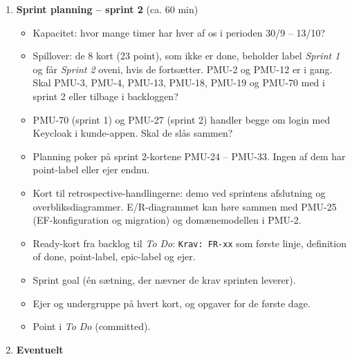 \documentclass[a4paper,11pt]{article}
\begin{document}
\begin{enumerate}
\begin{itemize}
\begin{itemize}
        \end{itemize}
        \item Skal definition of done justeres?
    \end{itemize}
    \item \textbf{Sprint planning -- sprint 2} (ca. 60 min)
    \begin{itemize}
        \item Kapacitet: hvor mange timer har hver af os i perioden 30/9 -- 13/10?
        \item Spillover: de 8 kort (23 point), som ikke er done, beholder label \emph{Sprint 1} og får \emph{Sprint 2} oveni, hvis de fortsætter. PMU-2 og PMU-12 er i gang. Skal PMU-3, PMU-4, PMU-13, PMU-18, PMU-19 og PMU-70 med i sprint 2 eller tilbage i backloggen?
        \item PMU-70 (sprint 1) og PMU-27 (sprint 2) handler begge om login med Keycloak i kunde-appen. Skal de slås sammen?
        \item Planning poker på sprint 2-kortene PMU-24 -- PMU-33. Ingen af dem har point-label eller ejer endnu.
        \item Kort til retrospective-handlingerne: demo ved sprintens afslutning og overbliksdiagrammer. E/R-diagrammet kan høre sammen med PMU-25 (EF-konfiguration og migration) og domænemodellen i PMU-2.
        \item Ready-kort fra backlog til \emph{To Do}: \texttt{Krav: FR-xx} som første linje, definition of done, point-label, epic-label og ejer.
        \item Sprint goal (én sætning, der nævner de krav sprinten leverer).
        \item Ejer og undergruppe på hvert kort, og opgaver for de første dage.
        \item Point i \emph{To Do} (committed).
    \end{itemize}
    \item \textbf{Eventuelt}
\end{enumerate}
\end{document}
